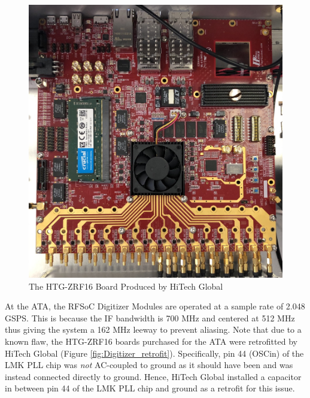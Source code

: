 \documentclass[12pt,a4paper,oneside]{article}
\begin{document}
%
\begin{figure}[H]
\centering
\includegraphics[width=1\linewidth]{figures/HiTech_Global_board.jpeg}
\caption{The HTG-ZRF16 Board Produced by HiTech Global}
\label{fig:HTG-ZRF16_Board}
\end{figure}
%

At the ATA, the RFSoC Digitizer Modules are operated at a sample rate of 2.048 GSPS. This is because the IF bandwidth is 700 MHz and centered at 512 MHz thus giving the system a 162 MHz leeway to prevent aliasing. Note that due to a known flaw, the HTG-ZRF16 boards purchased for the ATA were retrofitted by HiTech Global (Figure \ref{fig:Digitizer_retrofit}). Specifically, pin 44 (OSCin) of the LMK PLL chip was \emph{not} AC-coupled to ground as it should have been and was instead connected directly to ground. Hence, HiTech Global installed a capacitor in between pin 44 of the LMK PLL chip and ground as a retrofit for this issue. 
\end{document}
